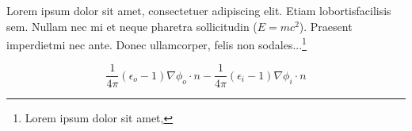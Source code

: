 \documentclass[17pt]{extarticle}
\begin{document}
Lorem  ipsum  dolor  sit  amet,  consectetuer  adipiscing  
elit.  Etiam  lobortisfacilisis sem.  Nullam nec mi et 
neque pharetra sollicitudin ($E = mc^2$).  Praesent imperdietmi nec ante. 
Donec ullamcorper, felis non sodales...\footnote{Lorem  ipsum  dolor  sit  amet, }

\begin{equation}
    \frac{1}{4 \pi} 
    (\epsilon_o - 1)
    \nabla \phi_o \cdot n 
    - \frac{1}{4 \pi}
    (\epsilon_i - 1)
    \nabla \phi_i \cdot n
\end{equation}
\end{document}
